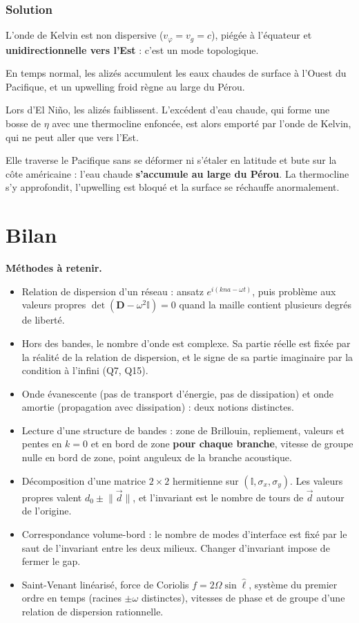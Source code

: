 \documentclass[11pt,a4paper]{article}
\providecommand{\tightlist}{\setlength{\itemsep}{0pt}\setlength{\parskip}{0pt}}
\begin{document}
\hypertarget{solution-44}{%
\subsubsection{Solution}\label{solution-44}}

L'onde de Kelvin est non dispersive (\(v_\varphi=v_g=c\)), piégée à l'équateur et \textbf{unidirectionnelle vers l'Est} : c'est un mode topologique.

En temps normal, les alizés accumulent les eaux chaudes de surface à l'Ouest du Pacifique, et un upwelling froid règne au large du Pérou.

Lors d'El Niño, les alizés faiblissent. L'excédent d'eau chaude, qui forme une bosse de \(\eta\) avec une thermocline enfoncée, est alors emporté par l'onde de Kelvin, qui ne peut aller que vers l'Est.

Elle traverse le Pacifique sans se déformer ni s'étaler en latitude et bute sur la côte américaine : l'eau chaude \textbf{s'accumule au large du Pérou}. La thermocline s'y approfondit, l'upwelling est bloqué et la surface se réchauffe anormalement.

\hypertarget{bilan}{%
\section{Bilan}\label{bilan}}

\textbf{Méthodes à retenir.}

\begin{itemize}
\tightlist
\item
  Relation de dispersion d'un réseau : ansatz \(e^{i(kna-\omega t)}\), puis problème aux valeurs propres \(\det(\mathbf D-\omega^2\mathbb I)=0\) quand la maille contient plusieurs degrés de liberté.
\item
  Hors des bandes, le nombre d'onde est complexe. Sa partie réelle est fixée par la réalité de la relation de dispersion, et le signe de sa partie imaginaire par la condition à l'infini (Q7, Q15).
\item
  Onde évanescente (pas de transport d'énergie, pas de dissipation) et onde amortie (propagation avec dissipation) : deux notions distinctes.
\item
  Lecture d'une structure de bandes : zone de Brillouin, repliement, valeurs et pentes en \(k=0\) et en bord de zone \textbf{pour chaque branche}, vitesse de groupe nulle en bord de zone, point anguleux de la branche acoustique.
\item
  Décomposition d'une matrice \(2\times2\) hermitienne sur \((\mathbb I,\sigma_x,\sigma_y)\). Les valeurs propres valent \(d_0\pm\lVert\vec d\rVert\), et l'invariant est le nombre de tours de \(\vec d\) autour de l'origine.
\item
  Correspondance volume-bord : le nombre de modes d'interface est fixé par le saut de l'invariant entre les deux milieux. Changer d'invariant impose de fermer le gap.
\item
  Saint-Venant linéarisé, force de Coriolis \(f=2\Omega\sin\hat\ell\), système du premier ordre en temps (racines \(\pm\omega\) distinctes), vitesses de phase et de groupe d'une relation de dispersion rationnelle.
\end{itemize}
\end{document}
